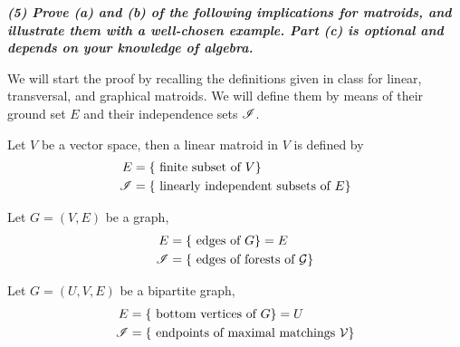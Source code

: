 \textbf{\textit{(5) Prove (a) and (b) of the following implications for matroids, and illustrate them with a well-chosen example. Part (c) is optional and depends on your knowledge of algebra.}}

\begin{center}
\end{center}

\vspace{3pt}

We will start the proof by recalling the definitions given in class for linear, transversal, and graphical matroids.
We will define them by means of their ground set $E$ and their independence sets $\mathscr{I}$.

\begin{definition}
    Let $V$ be a vector space, then a linear matroid in $V$ is defined by
    \begin{equation*}
        \begin{split}
            E & = \lbrace \text{ finite subset of } V \rbrace \\
            \mathscr{I} & = \lbrace \text{ linearly independent subsets of } E \rbrace
        \end{split}
    \end{equation*}
\end{definition}

\begin{definition}
    Let $G = (V, E)$ be a graph,
    \begin{equation*}
        \begin{split}
            E & = \lbrace \text{ edges of } G \rbrace = E \\
            \mathscr{I} & = \lbrace \text{ edges of forests of } \mathcal{G} \rbrace
        \end{split}
    \end{equation*}
\end{definition}

\begin{definition}
    Let $G = (U, V, E)$ be a bipartite graph,
    \begin{equation*}
        \begin{split}
            E & = \lbrace \text{ bottom vertices of } G \rbrace = U \\
            \mathscr{I} & = \lbrace \text{ endpoints of maximal matchings } \mathcal{V} \rbrace
        \end{split}
    \end{equation*}
\end{definition}

